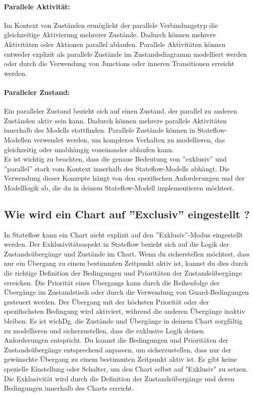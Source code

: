 \documentclass{article}
\begin{document}
\begin{multicols}{2}
				\paragraph{Parallele Aktivität:} Im Kontext von Zuständen ermöglicht der parallele Verbindungstyp die gleichzeitige Aktivierung mehrerer Zustände. Dadurch können mehrere Aktivitäten oder Aktionen parallel ablaufen. Parallele Aktivitäten können entweder explizit als parallele Zustände im Zustandsdiagramm modelliert werden oder durch die Verwendung von Junctions oder inneren Transitionen erreicht werden.
				\paragraph{Paralleler Zustand:} Ein paralleler Zustand bezieht sich auf einen Zustand, der parallel zu anderen Zuständen aktiv sein kann. Dadurch können mehrere parallele Aktivitäten innerhalb des Modells stattfinden. Parallele Zustände können in Stateflow-Modellen verwendet werden, um komplexes Verhalten zu modellieren, das gleichzeitig oder unabhängig voneinander ablaufen kann.\\
\newline
				Es ist wichtig zu beachten, dass die genaue Bedeutung von ''exklusiv'' und ''parallel'' stark vom Kontext innerhalb des Stateflow-Modells abhängt. Die Verwendung dieser Konzepte hängt von den spezifischen Anforderungen und der Modelllogik ab, die du in deinem Stateflow-Modell implementieren möchtest.
		\subsection{Wie wird ein Chart auf  ''Exclusiv'' eingestellt ?}
			In Stateflow kann ein Chart nicht explizit auf den ''Exklusiv''-Modus eingestellt werden. Der Exklusivitätsaspekt in Stateflow bezieht sich auf die Logik der Zustandsübergänge und Zustände im Chart.
			Wenn du sicherstellen möchtest, dass nur ein Übergang zu einem bestimmten Zeitpunkt aktiv ist, kannst du dies durch die richtige Definition der Bedingungen und Prioritäten der Zustandsübergänge erreichen. Die Priorität eines Übergangs kann durch die Reihenfolge der Übergänge im Zustandstisch oder durch die Verwendung von Guard-Bedingungen gesteuert werden. Der Übergang mit der höchsten Priorität oder der spezifischsten Bedingung wird aktiviert, während die anderen Übergänge inaktiv bleiben.
			Es ist wichDg, die Zustände und Übergänge in deinem Chart sorgfältig zu modellieren und sicherzustellen, dass die exklusive Logik deinen Anforderungen entspricht. Du kannst die Bedingungen und Prioritäten der Zustandsübergänge entsprechend anpassen, um sicherzustellen, dass nur der gewünschte Übergang zu einem bestimmten Zeitpunkt aktiv ist.
			Es gibt keine spezielle Einstellung oder Schalter, um den Chart selbst auf "Exklusiv" zu setzen. Die Exklusivität wird durch die Definition der Zustandsübergänge und deren Bedingungen innerhalb des Charts erreicht.

\end{multicols}
\end{document}

